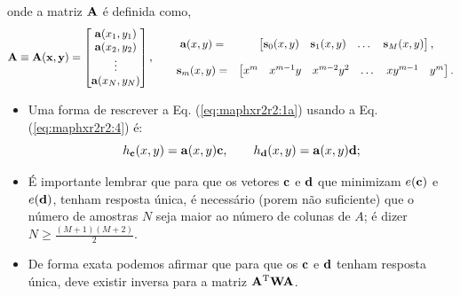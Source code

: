 \begin{theorem}
\begin{equation}
\end{equation}
onde a matriz $\MATRIX{A}$ é definida como,
\begin{equation}\label{eq:maphxr2r2:4}
\MATRIX{A}\equiv\MATRIX{A}(\VECTOR{x},\VECTOR{y})=\begin{bmatrix}
\VECTOR{a}(x_1,y_1)\\
\VECTOR{a}(x_2,y_2)\\
\vdots\\
\VECTOR{a}(x_N,y_N)\\
\end{bmatrix}, \qquad
\begin{matrix}
\VECTOR{a}(x,y)= &
\begin{bmatrix}
\VECTOR{s}_{0}(x,y) & \VECTOR{s}_{1}(x,y) &  \dots  & \VECTOR{s}_{M}(x,y)
\end{bmatrix},\\
~&~\\
\VECTOR{s}_{m}(x,y)=&
\begin{bmatrix}
x^m  & x^{m-1} y  & x^{m-2} y^2    & \dots  & x y^{m-1} &  y^m 
\end{bmatrix}.
\end{matrix}
\end{equation}


\end{theorem}

\begin{tcbattention}
\begin{itemize}
\item Uma forma de rescrever a Eq. (\ref{eq:maphxr2r2:1a}) usando a Eq. (\ref{eq:maphxr2r2:4}) é:
\begin{equation}\label{eq:maphxr2r2:5}
h_{\VECTOR{c}}(x,y) = \VECTOR{a}(x,y)\VECTOR{c}, 
\qquad
h_{\VECTOR{d}}(x,y) = \VECTOR{a}(x,y)\VECTOR{d}; 
\end{equation}

\item É importante lembrar que para que os vetores $\VECTOR{c}$ e $\VECTOR{d}$
que minimizam $e(\VECTOR{c})$ e $e(\VECTOR{d})$, tenham resposta única,
é necessário (porem não suficiente) que o número de amostras $N$ seja maior ao número de colunas de $A$;
é dizer $N\geq \frac{(M+1)(M+2)}{2}$.

\item De forma exata podemos afirmar que para que os $\VECTOR{c}$ e  $\VECTOR{d}$ tenham resposta única,
deve existir inversa para a matriz $\MATRIX{A}^{\transpose}\MATRIX{W}\MATRIX{A}$.

\end{itemize}
\end{tcbattention}


